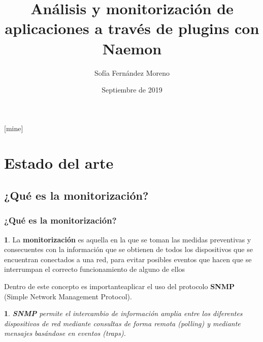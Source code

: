 \documentclass{beamer}
\title[]{Análisis y monitorización de aplicaciones a través de plugins con Naemon} %
\author{Sofía Fernández Moreno} %
\institute[UGR] %
{
  Universidad de Granada \\ %
}
\date{Septiembre de 2019} %
\theoremstyle{plain}
\theoremstyle{definition}
\newtheorem{defn}[thm]{}
\theoremstyle{plain}
\newtheorem{prop}[thm]{}
\theoremstyle{definition}
\theoremstyle{remark}
\theoremstyle{definition}
\begin{document}
\theoremstyle{definition}
[mine]

\frame{\titlepage}




\section{Estado del arte} %

\subsection{¿Qué es la monitorización?}
\begin{frame}
	\frametitle{¿Qué es la monitorización?}
	\begin{defn}
		La \textbf{monitorización} es aquella en la que se toman las medidas preventivas y
		consecuentes con la información que se obtienen de todos los dispositivos
		que se encuentran conectados a una red, para evitar posibles eventos que
		hacen que se interrumpan el correcto funcionamiento de alguno de ellos
	\end{defn}
Dentro de este concepto es importanteaplicar el uso del protocolo \textbf{SNMP} (Simple Network
Management Protocol).
\begin{prop}
	\textbf{SNMP} permite el intercambio de información amplia entre los diferentes dispositivos de red mediante consultas de forma remota (polling) y mediante mensajes basándose en eventos (traps).
\end{prop}

	
\end{frame}
\end{document}
